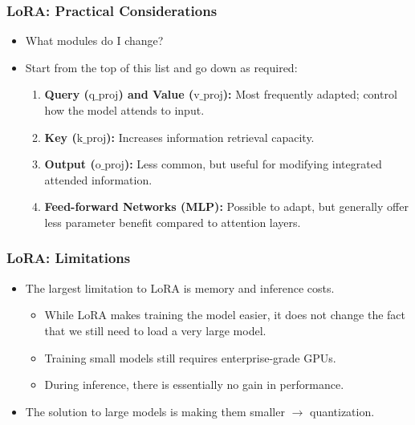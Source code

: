 \documentclass[24pt]{beamer}
\begin{document}
	\begin{frame}
		\frametitle{LoRA: Practical Considerations}
		
		\begin{itemize}
			\item What modules do I change?
			\item Start from the top of this list and go down as required:
			\begin{enumerate}
				\item \textbf{Query ($\text{q\_proj}$) and Value ($\text{v\_proj}$):} Most frequently adapted; control \alert{how the model attends} to input.
				\item \textbf{Key ($\text{k\_proj}$):} Increases \alert{information retrieval} capacity.
				\item \textbf{Output ($\text{o\_proj}$):} Less common, but useful for modifying \alert{integrated} attended information.
				\item \textbf{Feed-forward Networks (MLP):} Possible to adapt, but generally offer less parameter benefit compared to attention layers.
			\end{enumerate}
		\end{itemize}
		
	\end{frame}
	
	\begin{frame}
		\frametitle{LoRA: Limitations}
		
		\begin{itemize}
			\item The largest limitation to LoRA is \alert{memory} and \alert{inference} costs.
			\begin{itemize}
					\item While LoRA makes training the model easier, it does not change the fact that we still need to \alert{load a very large model}.
				\item Training small models still requires enterprise-grade GPUs.
				\item During inference, there is essentially \alert{no gain in performance}.
			\end{itemize}
			\item The solution to large models is making them smaller $\rightarrow$ \alert{quantization}.
		\end{itemize}
	\end{frame}
\end{document}
